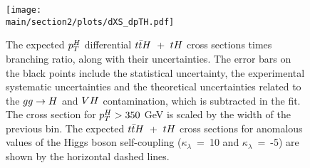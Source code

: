 \begin{figure}[htb!]
        \centering
        \texttt{[image: \\main/section2/plots/dXS\_dpTH.pdf]}
        \caption{The expected $p_{T}^{H}$ differential $t\bar{t}H$~+~$tH$ cross sections times branching ratio, along with their uncertainties. The error bars on the black points include the statistical uncertainty, the experimental systematic uncertainties and the theoretical uncertainties related to the $gg\rightarrow H$ and $VH$ contamination, which is subtracted in the fit.  The cross section for $p_{T}^{H}>350$ GeV is scaled by the width of the previous bin. The expected $t\bar{t}H$~+~$tH$ cross sections for anomalous values of the Higgs boson self-coupling ($\kappa_\lambda$~=~10 and $\kappa_\lambda$~=~-5) are shown by the horizontal dashed lines.}
        \label{fig:ttHdiff_CMS_ptH_xs}
\end{figure}


